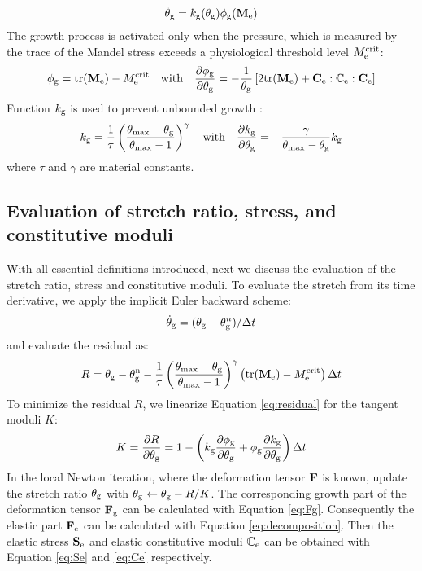 \begin{equation} \label{eq:stretchRatio}
\dot\theta_{\mathrm{g}} = k_{\mathrm{g}}(\theta_{\mathrm{g}})\phi_{\mathrm{g}}(\bold{M}_{\mathrm{e}})
\end{equation}
The growth process is activated only when the pressure, which is measured by the trace of the Mandel stress exceeds a physiological threshold level $M_{\mathrm{e}}^{\mathrm{crit}}$:
\begin{equation} \label{eq:stretchRatio2}
\phi_{\mathrm{g}} = \mathrm{tr}(\bold{M}_{\mathrm{e}}) - M_{\mathrm{e}}^{\mathrm{crit}} \quad \mathrm{with} \quad \frac{\partial \phi_{\mathrm{g}}}{\partial \theta_{\mathrm{g}}} = -\frac{1}{\theta_{\mathrm{g}}} \left[2\mathrm{tr}(\bold{M}_{\mathrm{e}}) + \bold{C}_{\mathrm{e}} : \mathbb{C}_{\mathrm{e}} : \bold{C}_{\mathrm{e}}\right]
\end{equation}
Function $k_{\mathrm{g}}$ is used to prevent unbounded growth \cite{Lubarda2}:
\begin{equation} \label{eq:stretchRatio3}
k_{\mathrm{g}} = \frac{1}{\tau}\left( \frac{\theta_\mathrm{max} - \theta_{\mathrm{g}}}{\theta_\mathrm{max} - 1} \right)^\gamma
\quad \mathrm{with} \quad 
\frac{\partial k_{\mathrm{g}}}{\partial \theta_{\mathrm{g}}} = -\frac{\gamma}{\theta_\mathrm{max} - \theta_{\mathrm{g}}}k_{\mathrm{g}}
\end{equation}
where $\tau$ and $\gamma$ are material constants.

\subsection{Evaluation of stretch ratio, stress, and constitutive moduli}
With all essential definitions introduced, next we discuss the evaluation of the stretch ratio, stress and constitutive moduli. To evaluate the stretch from its time derivative, we apply the implicit Euler backward scheme:
\begin{equation} \label{eq:Euler}
\dot\theta_{\mathrm{g}} = (\theta_{\mathrm{g}} - \theta_{\mathrm{g}}^n)/\Delta t
\end{equation}
and evaluate the residual as:
\begin{equation} \label{eq:residual}
R = \theta_{\mathrm{g}} - \theta_{\mathrm{g}}^\mathrm{n} - \frac{1}{\tau}\left( \frac{\theta_\mathrm{max} - \theta_{\mathrm{g}}}{\theta_\mathrm{max} - 1} \right)^\gamma\left(\mathrm{tr}(\bold{M}_{\mathrm{e}}) - M_{\mathrm{e}}^{\mathrm{crit}}\right)\Delta t
\end{equation}
To minimize the residual $R$, we linearize Equation \ref{eq:residual} for the tangent moduli $K$:
\begin{equation} \label{eq:K}
K = \frac{\partial R}{\partial \theta_{\mathrm{g}}} =  1 - \left( k_{\mathrm{g}} \frac{\partial \phi_{\mathrm{g}}}{\partial \theta_{\mathrm{g}}} + \phi_{\mathrm{g}} \frac{\partial k_{\mathrm{g}}}{\partial \theta_{\mathrm{g}}} \right)\Delta t
\end{equation}
In the local Newton iteration, where the deformation tensor $\bold{F}$ is known, update the stretch ratio $\theta_{\mathrm{g}}$ with $\theta_{\mathrm{g}} \leftarrow \theta_{\mathrm{g}} - R/K$. The corresponding growth part of the deformation tensor $\bold{F}_{\mathrm{g}}$ can be calculated with Equation \ref{eq:Fg}. Consequently the elastic part $\bold{F}_{\mathrm{e}}$ can be calculated with Equation \ref{eq:decomposition}. Then the elastic stress $\bold{S}_{\mathrm{e}}$ and elastic constitutive moduli $\mathbb{C}_{\mathrm{e}}$ can be obtained with Equation \ref{eq:Se} and \ref{eq:Ce} respectively.

